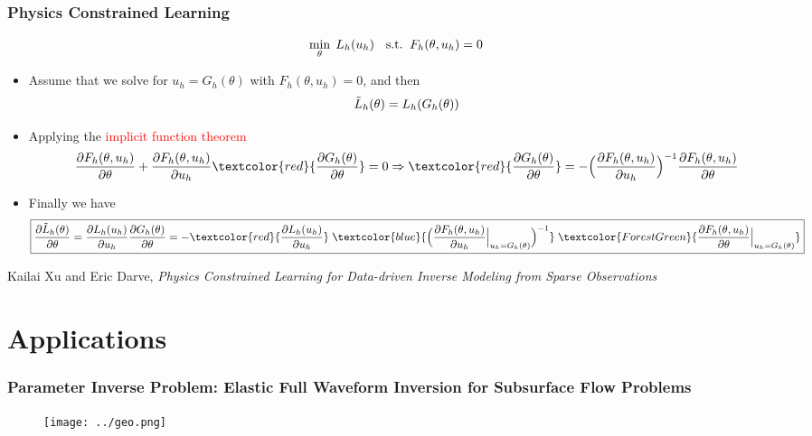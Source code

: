 \documentclass[usenames,dvipsnames]{beamer}
\begin{document}
\begin{frame}
	\frametitle{Physics Constrained Learning}
	$${\small    \min_{\theta}\; L_h(u_h) \quad \mathrm{s.t.}\;\; F_h(\theta, u_h) = 0}$$
	\begin{itemize}
		\item Assume that we solve for $u_h=G_h(\theta)$ with $F_h(\theta, u_h)=0$, and then
		      $${\small\tilde L_h(\theta)  = L_h(G_h(\theta))}$$
		\item Applying the \textcolor{red}{implicit function theorem}
		      {  \scriptsize
			      \begin{equation*}
				      \frac{{\partial {F_h(\theta, u_h)}}}{{\partial \theta }} + {\frac{{\partial {F_h(\theta, u_h)}}}{{\partial {u_h}}}}
				      \textcolor{red}{\frac{\partial G_h(\theta)}{\partial \theta}}
				      = 0 \Rightarrow
				      \textcolor{red}{\frac{\partial G_h(\theta)}{\partial \theta}} =  -\Big( \frac{{\partial {F_h(\theta, u_h)}}}{{\partial {u_h}}} \Big)^{ - 1} \frac{{\partial {F_h(\theta, u_h)}}}{{\partial \theta }}
			      \end{equation*}
		      }
		\item Finally we have
			      {\scriptsize
				      \begin{equation*}
					      \boxed{\frac{{\partial {{\tilde L}_h}(\theta )}}{{\partial \theta }}
					      = \frac{\partial {{ L}_h}(u_h )}{\partial u_h}\frac{\partial G_h(\theta)}{\partial \theta}=
					      - \textcolor{red}{ \frac{{\partial {L_h}({u_h})}}{{\partial {u_h}}} } \;
					      \textcolor{blue}{ \Big( {\frac{{\partial {F_h(\theta, u_h)}}}{{\partial {u_h}}}\Big|_{u_h = {G_h}(\theta )}} \Big)^{ - 1} } \;
					      \textcolor{ForestGreen}{ \frac{{\partial {F_h(\theta, u_h)}}}{{\partial \theta }}\Big|_{u_h = {G_h}(\theta )} }
					      }
				      \end{equation*}
			      }

	\end{itemize}

{\tiny Kailai Xu and Eric Darve, \textit{Physics Constrained Learning for Data-driven Inverse Modeling from Sparse Observations}}

\end{frame}



\section{Applications}


\begin{frame}
	\frametitle{Parameter Inverse Problem: Elastic Full Waveform Inversion for Subsurface Flow Problems}
	\begin{figure}[hbt]
  \texttt{[image: ../geo.png]}
\end{figure}
\end{frame}
\end{document}
